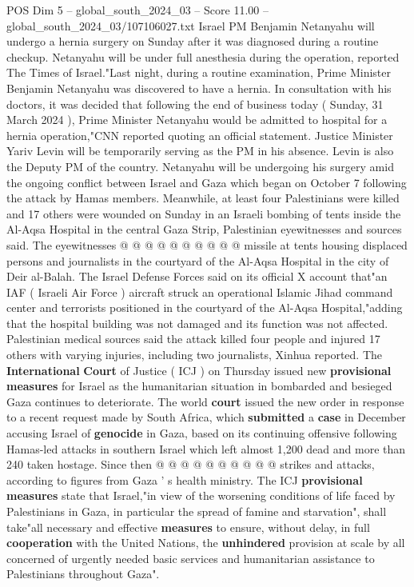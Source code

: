 \begin{textsample}{POS Dim 5 – global\_south\_2024\_03 – Score 11.00 – global\_south\_2024\_03/107106027.txt}  \label{ex:f5_pos_147}
Israel PM Benjamin Netanyahu will undergo a hernia surgery on Sunday after it was diagnosed during a routine checkup.
Netanyahu will be under full anesthesia during the operation, reported The Times of Israel."Last night, during a routine examination, Prime Minister Benjamin Netanyahu was discovered to have a hernia.
In consultation with his doctors, it was decided that following the end of business today ( Sunday, 31 March 2024 ), Prime Minister Netanyahu would be admitted to hospital for a hernia operation,"CNN reported quoting an official statement.
Justice Minister Yariv Levin will be temporarily serving as the PM in his absence.
Levin is also the Deputy PM of the country.
Netanyahu will be undergoing his surgery amid the ongoing conflict between Israel and Gaza which began on October 7 following the attack by Hamas members.
Meanwhile, at least four Palestinians were killed and 17 others were wounded on Sunday in an Israeli bombing of tents inside the Al-Aqsa Hospital in the central Gaza Strip, Palestinian eyewitnesses and sources said.
The eyewitnesses @ @ @ @ @ @ @ @ @ @ missile at tents housing displaced persons and journalists in the courtyard of the Al-Aqsa Hospital in the city of Deir al-Balah.
The Israel Defense Forces said on its official X account that"an IAF ( Israeli Air Force ) aircraft struck an operational Islamic Jihad command center and terrorists positioned in the courtyard of the Al-Aqsa Hospital,"adding that the hospital building was not damaged and its function was not affected.
Palestinian medical sources said the attack killed four people and injured 17 others with varying injuries, including two journalists, Xinhua reported.
The \textbf{International} \textbf{Court} of Justice ( ICJ ) on Thursday issued new \textbf{provisional} \textbf{measures} for Israel as the humanitarian situation in bombarded and besieged Gaza continues to deteriorate.
The world \textbf{court} issued the new order in response to a recent request made by South Africa, which \textbf{submitted} a \textbf{case} in December accusing Israel of \textbf{genocide} in Gaza, based on its continuing offensive following Hamas-led attacks in southern Israel which left almost 1,200 dead and more than 240 taken hostage.
Since then @ @ @ @ @ @ @ @ @ @ strikes and attacks, according to figures from Gaza ' s health ministry.
The ICJ \textbf{provisional} \textbf{measures} state that Israel,"in view of the worsening conditions of life faced by Palestinians in Gaza, in particular the spread of famine and starvation", shall take"all necessary and effective \textbf{measures} to ensure, without delay, in full \textbf{cooperation} with the United Nations, the \textbf{unhindered} provision at scale by all concerned of urgently needed basic services and humanitarian assistance to Palestinians throughout Gaza".

\end{textsample}
